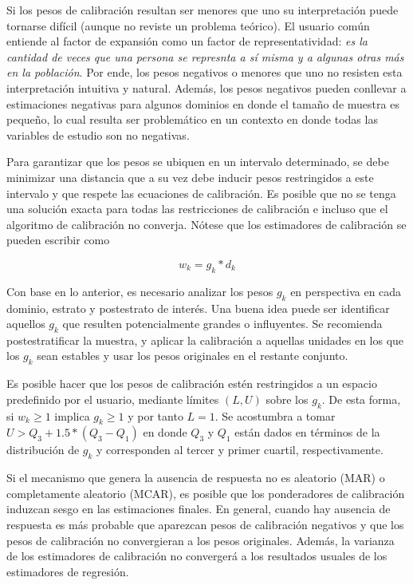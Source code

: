 \documentclass[
  12pt,
  spanish,
]{book}
\begin{document}
Si los pesos de calibración resultan ser menores que uno su interpretación puede tornarse difícil (aunque no reviste un problema teórico). El usuario común entiende al factor de expansión como un factor de representatividad: \emph{es la cantidad de veces que una persona se represnta a sí misma y a algunas otras más en la población}. Por ende, los pesos negativos o menores que uno no resisten esta interpretación intuitiva y natural. Además, los pesos negativos pueden conllevar a estimaciones negativas para algunos dominios en donde el tamaño de muestra es pequeño, lo cual resulta ser problemático en un contexto en donde todas las variables de estudio son no negativas.

Para garantizar que los pesos se ubiquen en un intervalo determinado, se debe minimizar una distancia que a su vez debe inducir pesos restringidos a este intervalo y que respete las ecuaciones de calibración. Es posible que no se tenga una solución exacta para todas las restricciones de calibración e incluso que el algoritmo de calibración no converja. Nótese que los estimadores de calibración se pueden escribir como

\[
w_k = g_k * d_k
\]

Con base en lo anterior, es necesario analizar los pesos \(g_k\) en perspectiva en cada dominio, estrato y postestrato de interés. Una buena idea puede ser identificar aquellos \(g_k\) que resulten potencialmente grandes o influyentes. Se recomienda postestratificar la muestra, y aplicar la calibración a aquellas unidades en los que los \(g_k\) sean estables y usar los pesos originales en el restante conjunto.

Es posible hacer que los pesos de calibración estén restringidos a un espacio predefinido por el usuario, mediante límites \((L, U)\) sobre los \(g_k\). De esta forma, si \(w_k \geq 1\) implica \(g_k \geq 1\) y por tanto \(L=1\). Se acostumbra a tomar \(U > Q_3 + 1.5 * (Q_3 - Q_1)\) en donde \(Q_3\) y \(Q_1\) están dados en términos de la distribución de \(g_k\) y corresponden al tercer y primer cuartil, respectivamente.

Si el mecanismo que genera la ausencia de respuesta no es aleatorio (MAR) o completamente aleatorio (MCAR), es posible que los ponderadores de calibración induzcan sesgo en las estimaciones finales. En general, cuando hay ausencia de respuesta es más probable que aparezcan pesos de calibración negativos y que los pesos de calibración no convergieran a los pesos originales. Además, la varianza de los estimadores de calibración no convergerá a los resultados usuales de los estimadores de regresión.
\end{document}
